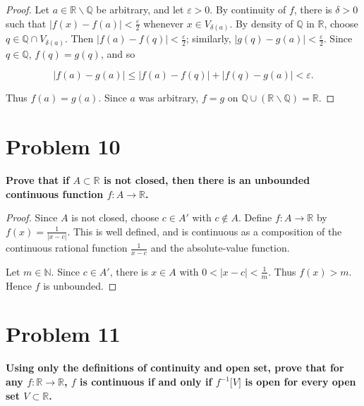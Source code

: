 \begin{proof}

Let \(a \in \mathbb{R} \smallsetminus \mathbb{Q}\) be arbitrary, and let \(\varepsilon > 0\). By continuity of \(f\), there is \(\delta > 0\) such that \(\left| {f(x) - f(a)} \right| < \frac{\varepsilon}{2}\) whenever \(x \in V_{\delta{(a)}}\). By density of \(\mathbb{Q}\) in \(\mathbb{R}\), choose \(q \in \mathbb{Q} \cap V_{\delta{(a)}}\). Then \(\left| {f(a) - f(q)} \right| < \frac{\varepsilon}{2}\); similarly, \(\left| {g(q) - g(a)} \right| < \frac{\varepsilon}{2}\). Since \(q \in \mathbb{Q}\), \(f(q) = g(q)\), and so

\[\left| {f(a) - g(a)} \right| \leq \left| {f(a) - f(q)} \right| + \left| {f(q) - g(a)} \right| < \varepsilon.\]

Thus \(f(a) = g(a)\). Since \(a\) was arbitrary, \(f = g\) on \(\mathbb{Q} \cup \left( {\mathbb{R} \smallsetminus \mathbb{Q}} \right) = \mathbb{R}\).

\end{proof}

\section{Problem 10}

\textbf{Prove that if \(A \subset \mathbb{R}\) is not closed, then there is an unbounded continuous function \(f:A\rightarrow\mathbb{R}\).}

\begin{proof}

Since \(A\) is not closed, choose \(c \in A'\) with \(c \notin A\). Define \(f:A\rightarrow\mathbb{R}\) by \(f(x) = \frac{1}{\left| {x - c} \right|}\). This is well defined, and is continuous as a composition of the continuous rational function \(\frac{1}{x - c}\) and the absolute-value function.

Let \(m \in \mathbb{N}\). Since \(c \in A'\), there is \(x \in A\) with \(0 < \left| {x - c} \right| < \frac{1}{m}\). Thus \(f(x) > m\). Hence \(f\) is unbounded.

\end{proof}

\section{Problem 11}

\textbf{Using only the definitions of continuity and open set, prove that for any \(f:\mathbb{R}\rightarrow\mathbb{R}\), \(f\) is continuous if and only if \(f^{- 1}\lbrack V\rbrack\) is open for every open set \(V \subset \mathbb{R}\).}


